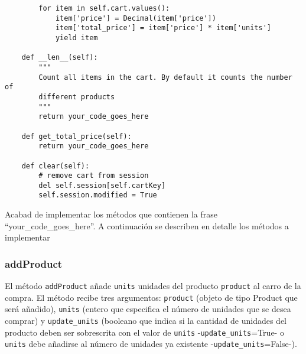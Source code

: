 \documentclass[12pt]{article} %
\newcommand{\ttt}[1]{\texttt{#1}}%
\begin{document}
\begin{lstlisting}
        for item in self.cart.values():
            item['price'] = Decimal(item['price'])
            item['total_price'] = item['price'] * item['units']
            yield item

    def __len__(self):
        """
        Count all items in the cart. By default it counts the number of 
        different products
        """
        return your_code_goes_here

    def get_total_price(self):
        return your_code_goes_here

    def clear(self):
        # remove cart from session
        del self.session[self.cartKey]
        self.session.modified = True

  \end{lstlisting}

Acabad de implementar los métodos que contienen la frase ``your\_code\_goes\_here''.
 A continuación se describen en detalle los métodos a implementar

\subsubsection{addProduct}


El método \ttt{addProduct} añade \ttt{units} unidades del producto \ttt{product}
al carro de la compra. El método recibe tres argumentos: \ttt{product} (objeto de tipo Product que será añadido), \ttt{units} (entero que especifica el número de unidades que se desea comprar) y \ttt{update\_units} (booleano que indica si la cantidad de unidades del producto deben ser sobrescrita con el valor de \ttt{units} -\ttt{update\_units}=True- o \ttt{units} debe añadirse al número de unidades ya existente -\ttt{update\_units}=False-).
\end{document}

